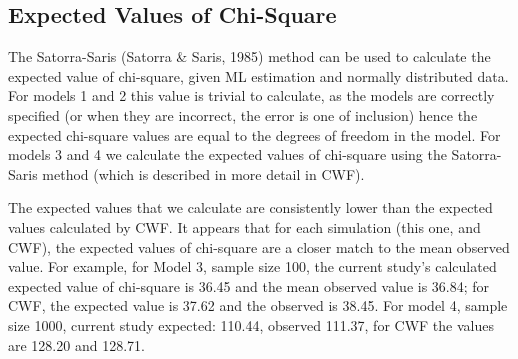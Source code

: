 \documentclass[
  letterpaper,
  DIV=11,
  numbers=noendperiod]{scrartcl}
\begin{document}
\begin{figure}[H]


\caption{\label{fig-plot_rejects_4}}

\end{figure}%

\subsection{Expected Values of
Chi-Square}\label{expected-values-of-chi-square}

The Satorra-Saris (Satorra \& Saris, 1985) method can be used to
calculate the expected value of chi-square, given ML estimation and
normally distributed data. For models 1 and 2 this value is trivial to
calculate, as the models are correctly specified (or when they are
incorrect, the error is one of inclusion) hence the expected chi-square
values are equal to the degrees of freedom in the model. For models 3
and 4 we calculate the expected values of chi-square using the
Satorra-Saris method (which is described in more detail in CWF).

The expected values that we calculate are consistently lower than the
expected values calculated by CWF. It appears that for each simulation
(this one, and CWF), the expected values of chi-square are a closer
match to the mean observed value. For example, for Model 3, sample size
100, the current study's calculated expected value of chi-square is
36.45 and the mean observed value is 36.84; for CWF, the expected value
is 37.62 and the observed is 38.45. For model 4, sample size 1000,
current study expected: 110.44, observed 111.37, for CWF the values are
128.20 and 128.71.
\end{document}
